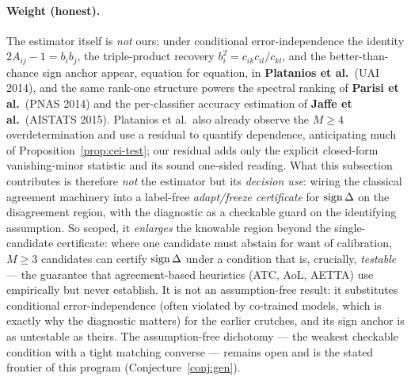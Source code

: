 \paragraph{Weight (honest).} The estimator itself is \emph{not} ours: under conditional
error-independence the identity $2A_{ij}-1=b_ib_j$, the triple-product recovery
$b_i^2=c_{ik}c_{il}/c_{kl}$, and the better-than-chance sign anchor appear, equation for
equation, in \textbf{Platanios et al.}\ (UAI 2014), and the same rank-one structure powers
the spectral ranking of \textbf{Parisi et al.}\ (PNAS 2014) and the per-classifier
accuracy estimation of \textbf{Jaffe et al.}\ (AISTATS 2015). Platanios et al.\ also
already observe the $M\ge4$ overdetermination and use a residual to quantify dependence,
anticipating much of Proposition~\ref{prop:cei-test}; our residual adds only the explicit
closed-form vanishing-minor statistic and its sound one-sided reading. What this
subsection contributes is therefore \emph{not} the estimator but its \emph{decision use}:
wiring the classical agreement machinery into a label-free \emph{adapt/freeze certificate}
for $\operatorname{sign}\Delta$ on the disagreement region, with the diagnostic as a checkable guard on
the identifying assumption. So scoped, it \emph{enlarges} the knowable region beyond the
single-candidate certificate: where one candidate must abstain for want of calibration,
$M\ge3$ candidates can certify $\operatorname{sign}\Delta$ under a condition that is, crucially,
\emph{testable} --- the guarantee that agreement-based heuristics (ATC, AoL, AETTA) use
empirically but never establish. It is not an assumption-free result: it substitutes
conditional error-independence (often violated by co-trained models, which is exactly why
the diagnostic matters) for the earlier crutches, and its sign anchor is as untestable as
theirs. The assumption-free dichotomy --- the weakest checkable condition with a tight
matching converse --- remains open and is the stated frontier of this program
(Conjecture~\ref{conj:gen}).

